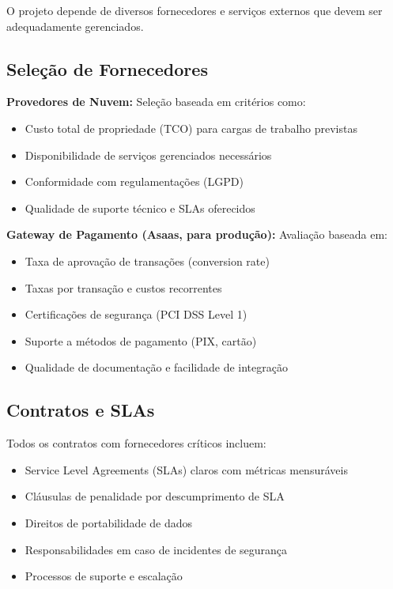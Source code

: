 O projeto depende de diversos fornecedores e serviços externos que devem ser adequadamente gerenciados.

\subsection{Seleção de Fornecedores}

\textbf{Provedores de Nuvem:} Seleção baseada em critérios como:
\begin{itemize}
    \item Custo total de propriedade (TCO) para cargas de trabalho previstas
    \item Disponibilidade de serviços gerenciados necessários
    \item Conformidade com regulamentações (LGPD)
    \item Qualidade de suporte técnico e SLAs oferecidos
\end{itemize}

\textbf{Gateway de Pagamento (Asaas, para produção):} Avaliação baseada em:
\begin{itemize}
    \item Taxa de aprovação de transações (conversion rate)
    \item Taxas por transação e custos recorrentes
    \item Certificações de segurança (PCI DSS Level 1)
    \item Suporte a métodos de pagamento (PIX, cartão)
    \item Qualidade de documentação e facilidade de integração
\end{itemize}

\subsection{Contratos e SLAs}

Todos os contratos com fornecedores críticos incluem:
\begin{itemize}
    \item Service Level Agreements (SLAs) claros com métricas mensuráveis
    \item Cláusulas de penalidade por descumprimento de SLA
    \item Direitos de portabilidade de dados
    \item Responsabilidades em caso de incidentes de segurança
    \item Processos de suporte e escalação
\end{itemize}

